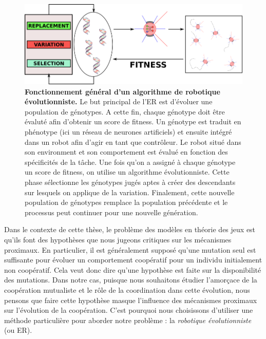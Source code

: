    \begin{figure}[hbt]
        \begin{center}
          \includegraphics[scale = 0.50]{fig/Intro/EvolutionaryRobotics.png}
          \caption{\textbf{Fonctionnement général d'un algorithme de robotique évolutionniste.}
          Le but principal de l'ER est d'évoluer une population de génotypes. A cette fin, chaque génotype doit être évaluté afin d'obtenir un score de fitness. Un génotype est traduit en phénotype (ici un réseau de neurones artificiels) et ensuite intégré dans un robot afin d'agir en tant que contrôleur. Le robot situé dans son environment et son comportement est évalué en fonction des spécificités de la tâche. Une fois qu'on a assigné à chaque génotype un score de fitness, on utilise un algorithme évolutionniste. Cette phase sélectionne les génotypes jugés aptes à créer des descendants sur lesquels on applique de la variation. Finalement, cette nouvelle population de génotypes remplace la population précédente et le processus peut continuer pour une nouvelle génération.} 
          \label{fig:EvolutionaryRobotics}
        \end{center}
    \end{figure}

    Dans le contexte de cette thèse, le problème des modèles en théorie des jeux est qu'ils font des hypothèses que nous jugeons critiques sur les mécanismes proximaux. En particulier, il est généralement supposé qu'une mutation seul est suffisante pour évoluer un comportement coopératif pour un individu initialement non coopératif. Cela veut donc dire qu'une hypothèse est faite sur la disponibilité des mutations. Dans notre cas, puisque nous souhaitons étudier l'amorçace de la coopération mutualiste et le rôle de la coordination dans cette évolution, nous pensons que faire cette hypothèse masque l'influence des mécanismes proximaux sur l'évolution de la coopération. C'est pourquoi nous choisissons d'utiliser une méthode particulière pour aborder notre problème : la \emph{robotique évolutionniste} (ou ER).


